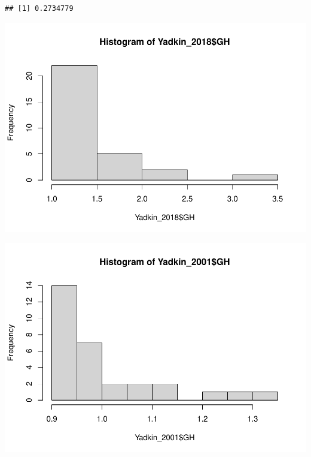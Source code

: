 \documentclass[
  12pt,
]{article}
\newenvironment{Shaded}{\begin{snugshade}}{\end{snugshade}}
\newcommand{\FunctionTok}[1]{\textcolor[rgb]{0.00,0.00,0.00}{#1}}
\newcommand{\NormalTok}[1]{#1}
\newcommand{\SpecialCharTok}[1]{\textcolor[rgb]{0.00,0.00,0.00}{#1}}
\begin{document}
\begin{verbatim}
## [1] 0.2734779
\end{verbatim}

\begin{Shaded}
\end{Shaded}

\includegraphics{Project_Template_files/figure-latex/T-Test-1.pdf}

\begin{Shaded}
\end{Shaded}

\includegraphics{Project_Template_files/figure-latex/T-Test-2.pdf}
\end{document}
